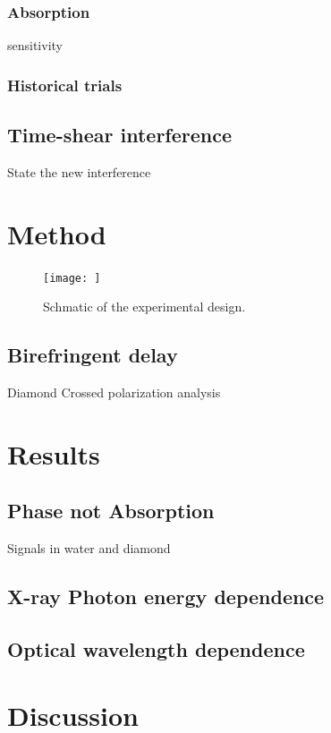 \documentclass{article}
\begin{document}
\subsubsection{Absorption}
	sensitivity
\subsubsection{Historical trials}

\subsection{Time-shear interference}
State the new interference

\section{Method}
\begin{figure}
\centerline{\texttt{[image: ]}}
\caption{\label{fig::cartoon} Schmatic of the experimental design.}
\end{figure}
\subsection{Birefringent delay}
Diamond
Crossed polarization analysis

\section{Results}
\subsection{Phase not Absorption}
Signals in water and diamond
\subsection{X-ray Photon energy dependence}
\subsection{Optical wavelength dependence}

\section{Discussion}
\end{document}
